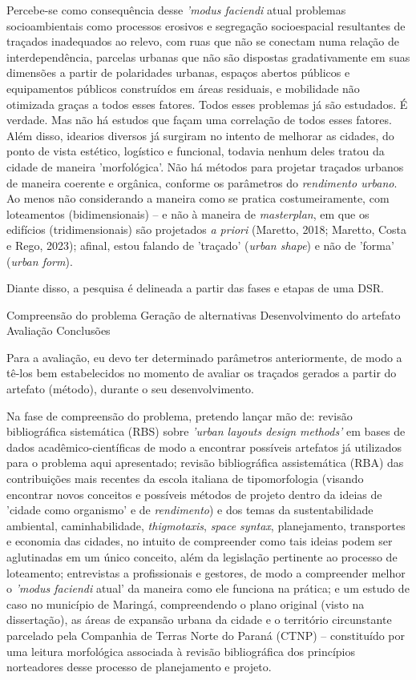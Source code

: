 \documentclass[]{report}
\begin{document}
    Percebe-se como consequência desse \textit{'modus faciendi} atual problemas socioambientais como processos erosivos e segregação socioespacial resultantes de traçados inadequados ao relevo, com ruas que não se conectam numa relação de interdependência, parcelas urbanas que não são dispostas gradativamente em suas dimensões a partir de polaridades urbanas, espaços abertos públicos e equipamentos públicos construídos em áreas residuais, e mobilidade não otimizada graças a todos esses fatores. Todos esses problemas já são estudados. É verdade. Mas não há estudos que façam uma correlação de todos esses fatores. Além disso, idearios diversos já surgiram no intento de melhorar as cidades, do ponto de vista estético, logístico e funcional, todavia nenhum deles tratou da cidade de maneira 'morfológica'. Não há métodos para projetar traçados urbanos de maneira coerente e orgânica, conforme os parâmetros do \textit{rendimento urbano}. Ao menos não considerando a maneira como se pratica costumeiramente, com loteamentos (bidimensionais) – e não à maneira de \textit{masterplan}, em que os edifícios (tridimensionais) são projetados \textit{a priori} (Maretto, 2018; Maretto, Costa e Rego, 2023); afinal, estou falando de 'traçado' (\textit{urban shape}) e não de 'forma' (\textit{urban form}).

    Diante disso, a pesquisa é delineada a partir das fases e etapas de uma DSR.

    Compreensão do problema
    Geração de alternativas
    Desenvolvimento do artefato
    Avaliação
    Conclusões

    Para a avaliação, eu devo ter determinado parâmetros anteriormente, de modo a tê-los bem estabelecidos no momento de avaliar os traçados gerados a partir do artefato (método), durante o seu desenvolvimento.

    Na fase de compreensão do problema, pretendo lançar mão de: revisão bibliográfica sistemática (RBS) sobre \textit{'urban layouts design methods'} em bases de dados acadêmico-científicas de modo a encontrar possíveis artefatos já utilizados para o problema aqui apresentado; revisão bibliográfica assistemática (RBA) das contribuições mais recentes da escola italiana de tipomorfologia (visando encontrar novos conceitos e possíveis métodos de projeto dentro da ideias de 'cidade como organismo' e de \textit{rendimento}) e dos temas da sustentabilidade ambiental, caminhabilidade, \textit{thigmotaxis}, \textit{space syntax}, planejamento, transportes e economia das cidades, no intuito de compreender como tais ideias podem ser aglutinadas em um único conceito, além da legislação pertinente ao processo de loteamento;  entrevistas a profissionais e gestores, de modo a compreender melhor o \textit{'modus faciendi} atual' da maneira como ele funciona na prática; e um estudo de caso no município de Maringá, compreendendo o plano original (visto na dissertação), as áreas de expansão urbana da cidade e o território circunstante parcelado pela Companhia de Terras Norte do Paraná (CTNP) – constituído por uma leitura morfológica associada à revisão bibliográfica dos princípios norteadores desse processo de planejamento e projeto.
\end{document}
